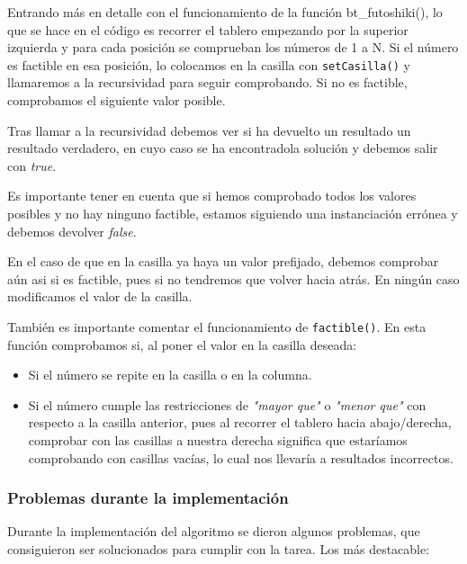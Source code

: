 \documentclass[12pt]{article}
\begin{document}

Entrando más en detalle con el funcionamiento de la función bt\_futoshiki(),
lo que se hace en el código es recorrer el tablero empezando por la superior 
izquierda y para cada posición se comprueban los números de 1 a N. Si el número es factible en esa posición, lo colocamos en la casilla con \verb|setCasilla()|
y llamaremos a la recursividad para seguir comprobando. Si no es factible, comprobamos el siguiente valor posible.

Tras llamar a la recursividad debemos ver si ha devuelto un resultado un resultado verdadero, en cuyo caso se ha encontradola solución y debemos
salir con \textit{true}.

Es importante tener en cuenta que si hemos  comprobado todos los valores posibles y no hay ninguno factible, estamos siguiendo una instanciación errónea y debemos devolver \textit{false}.

En el caso de que en la casilla ya haya un valor prefijado, debemos comprobar aún asi si es factible, pues si
no tendremos que volver hacia atrás. En ningún caso modificamos el valor de la casilla.

También es importante comentar el funcionamiento de \verb|factible()|. En esta función comprobamos si, al poner el valor en la casilla deseada:
 \begin{itemize}
    \item Si el número se repite en la casilla o en la columna.
    \item Si el número cumple las restricciones de \textit{"mayor que"} o \textit{"menor que"} con respecto a la 
        casilla anterior, pues al recorrer el tablero hacia abajo/derecha, comprobar con las casillas a nuestra derecha
        significa que estaríamos comprobando con casillas vacías, lo cual nos llevaría a resultados incorrectos.
 \end{itemize}

\subsubsection{Problemas durante la implementación}

Durante la implementación del algoritmo se dieron algunos problemas, que consiguieron ser solucionados para cumplir con la tarea. Los más destacable:
\end{document}

